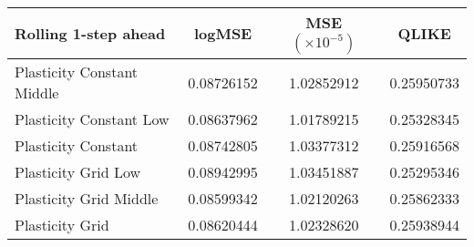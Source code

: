 
\begin{tabular}{l|c|c|c}
Rolling 1-step ahead     & logMSE & MSE $(\times 10^{-5})$ & QLIKE \\\hline
Plasticity Constant Middle & 0.08726152 & 1.02852912 & 0.25950733\\ 
Plasticity Constant Low & 0.08637962 & 1.01789215 & 0.25328345\\ 
Plasticity Constant & 0.08742805 & 1.03377312 & 0.25916568\\ 
Plasticity Grid Low & 0.08942995 & 1.03451887 & 0.25295346\\ 
Plasticity Grid Middle & 0.08599342 & 1.02120263 & 0.25862333\\ 
Plasticity Grid & 0.08620444 & 1.02328620 & 0.25938944\\ 
\end{tabular}